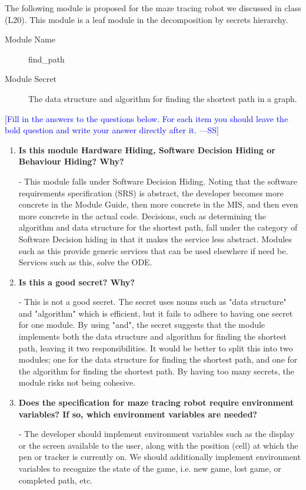 \documentclass[12pt,fleqn]{examtst}
\newcommand{\authornote}[3]{\textcolor{#1}{[#3 ---#2]}}
\newcommand{\authornote}[3]{}
\newcommand{\wss}[1]{\authornote{blue}{SS}{#1}}
\begin{document}

\newpage

 The following module is proposed for the maze tracing robot
we discussed in class (L20).  This module is a leaf module in the decomposition
by secrets hierarchy.

\begin{description}
\item [Module Name] find\_path
\item [Module Secret] The data structure and algorithm for finding the shortest
  path in a graph.
\end{description}

\noindent \wss{Fill in the answers to the questions below.  For each item you
  should leave the bold question and write your answer directly after it.}

\begin{enumerate}
\item \textbf{Is this module Hardware Hiding, Software Decision Hiding or
    Behaviour Hiding?  Why?}

  - This module falls under Software Decision Hiding. Noting that the software requirements specification (SRS) is abstract, the developer becomes more concrete in the Module Guide, then more concrete in the MIS, and then even more concrete in the actual code. Decisions, such as determining the algorithm and data structure for the shortest path, fall under the category of Software Decision hiding in that it makes the service less abstract. Modules such as this provide generic services that can be used elsewhere if need be. Services such as this, solve the ODE. 

\item \textbf{Is this a good secret?  Why?}

  - This is not a good secret. The secret uses nouns such as "data structure" and "algorithm" which is efficient, but it fails to adhere to having one secret for one module. By using "and", the secret suggests that the module implements both the data structure and algorithm for finding the shortest path, leaving it two responsibilities. It would be better to split this into two modules; one for the data structure for finding the shortest path, and one for the algorithm for finding the shortest path. By having too many secrets, the module risks not being cohesive.  

\item \textbf{Does the specification for maze tracing robot require environment
    variables?  If so, which environment variables are needed?}

  - The developer should implement environment variables such as the display or the screen available to the user, along with the position (cell) at which the pen or tracker is currently on. We should additionally implement environment variables to recognize the state of the game, i.e. new game, lost game, or completed path, etc.

\end{enumerate}
\end{document}
